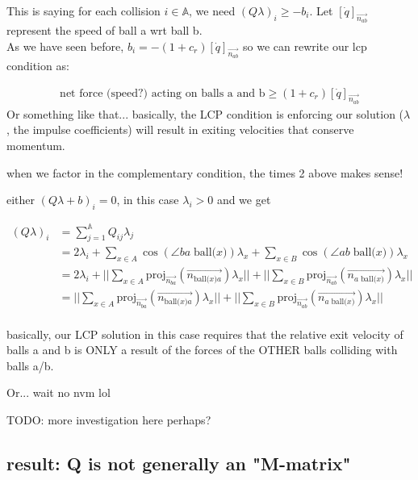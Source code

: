 \documentclass[12pt]{article}
\newcommand{\bigA}{{\mathbb{A}}}
\newcommand{\ball}[1]{\text{ball(} #1 \text{)}}
\newcommand{\proj}[2]{\text{proj}_{#1}(#2)}
\begin{document}
This is saying for each collision $i \in \bigA$, we need $(Q\lambda)_i \geq -b_i$.
Let $[\dot{q}]_{\overrightarrow{n_{ab}}}$ represent the speed of ball a wrt ball b.\\
As we have seen before, $b_i = -(1 + c_r) [\dot{q}]_{\overrightarrow{n_{ab}}}$
so we can rewrite our lcp condition as:

\begin{align*}
    \text{net force (speed?) acting on balls a and b} \geq (1 + c_r) [\dot{q}]_{\overrightarrow{n_{ab}}}
\end{align*}
\newline{}
Or something like that... basically, the LCP condition is enforcing our solution ($\lambda$,
the impulse coefficients) will result in exiting velocities that conserve momentum.


when we factor in the complementary condition, the times 2 above makes sense!

either $(Q\lambda + b)_i = 0$, in this case $\lambda_i > 0$ and we get

\begin{align*}
(Q \lambda)_i &= \sum_{j = 1}^{\bigA} Q_{ij} \lambda_j\\
    &= 2\lambda_i + \sum_{x \in A}^{} \cos(\angle ba\;\ball{x})\lambda_x + \sum_{x \in B}^{} \cos(\angle ab\;\ball{x})\lambda_x\\
    &= 2\lambda_i
        + ||\sum_{x \in A}^{}\proj{\overrightarrow{n_{ba}}}{\overrightarrow{n_{\ball{x}a}}} \lambda_x||
        + ||\sum_{x \in B}^{}\proj{\overrightarrow{n_{ab}}}{\overrightarrow{n_{a\;\ball{x}}}} \lambda_x||\\
    &= ||\sum_{x \in A}^{}\proj{\overrightarrow{n_{ba}}}{\overrightarrow{n_{\ball{x}a}}} \lambda_x||
        + ||\sum_{x \in B}^{}\proj{\overrightarrow{n_{ab}}}{\overrightarrow{n_{a\;\ball{x}}}} \lambda_x||\\
\end{align*}

basically, our LCP solution in this case requires that the relative exit velocity of balls
a and b is ONLY a result of the forces of the OTHER balls colliding with balls a/b.

Or... wait no nvm lol

TODO: more investigation here perhaps?

\subsection*{result: Q is not generally an "M-matrix"}
\end{document}
